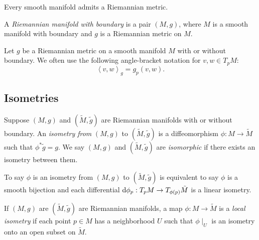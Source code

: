 \begin{proposition}
  \label{proposition-smooth-manifold-admit-Riemannian-metric}
  Every smooth manifold admits a Riemannian metric.
\end{proposition}

\begin{definition}
  \label{definition-Riemannian-manifold-with-boundary}
  A \emph{Riemannian manifold with boundary} is a pair \( (M, g) \), where \( M \) is a smooth manifold with boundary and \( g \) is a Riemannian metric on \( M \).
\end{definition}

Let \( g \) be a Riemannian metric on a smooth manifold \( M \) with or without boundary.
We often use the following angle-bracket notation for \( v, w \in T_p M \):
\[
  \left\langle v, w \right\rangle_g = g_p(v, w).
\]

\subsection{Isometries}
\label{subsection-isometries}

\begin{definition}
  \label{definition-isometry}
  \label{definition-isometric}
  Suppose \( (M, g) \) and \( (\tilde{M}, \tilde{g}) \) are Riemannian manifolds with or without boundary.
  An \emph{isometry from} \( (M, g) \) to \( (\tilde{M}, \tilde{g}) \) is a diffeomorphism \( \phi: M \to \tilde{M} \) such that \( \phi^* \tilde{g} = g \).
  We say \( (M, g) \) and \( (\tilde{M}, \tilde{g}) \) are \emph{isomorphic} if there exists an isometry between them.
\end{definition}
\begin{remark}
  \label{remark-isometry}
  To say \( \phi \) is an isometry from \( (M, g) \) to \( (\tilde{M}, \tilde{g}) \) is equivalent to say \( \phi \) is a smooth bijection and each differential \( \mathop{}\!\mathrm{d} \phi_p: T_p M \to T_{\phi(p)} \tilde{M} \) is a linear isometry.
\end{remark}

\begin{definition}
  \label{definition-local-isometry}
  If \( (M, g) \) are \( (\tilde{M}, \tilde{g}) \) are Riemannian manifolds, a map \( \phi: M \to \tilde{M} \) is a \emph{local isometry} if each point \( p \in M \) has a neighborhood \( U \) such that \( \phi \mid_U \) is an isometry onto an open subset on \( \tilde{M} \).
\end{definition}

